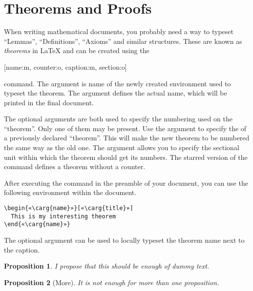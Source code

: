 \section{Theorems and Proofs}

When writing mathematical documents, you probably need a way to typeset
\enquote{Lemmas}, \enquote{Definitions}, \enquote{Axioms} and similar
structures. These are known as \emph{theorems} in \LaTeX{} and can be created
using the
\begin{lscommand}
  [name:m, counter:o, caption:m, section:o]
\end{lscommand}
command. The  argument is name of the newly created environment used
to typeset the theorem. The  argument defines the actual name,
which will be printed in the final document.

The optional arguments are both used to specify the numbering used on the
\enquote{theorem}. Only one of them may be present. Use the 
argument to specify the  of a previously declared \enquote{theorem}.
This will make the new theorem to be numbered the same way as the old one. The
 argument allows you to specify the sectional unit within which
the theorem should get its numbers. The starred version of the command defines
a theorem without a counter.

After executing the  command in the preamble of your document,
you can use the following environment within the document.
\begin{verbatim}
\begin{«\carg{name}»}[«\carg{title}»]
  This is my interesting theorem
\end{«\carg{name}»}
\end{verbatim}
The optional  argument can be used to locally typeset the theorem
name next to the caption.
\begin{example}[standalone, paperheight=4cm]
\newtheorem{proposition}{Proposition}
\begin{proposition}
  I propose that this should 
  be enough of dummy text.
\end{proposition}
\begin{proposition}[More]
  It is not enough for more
  than one proposition.
\end{proposition}
\end{example}

